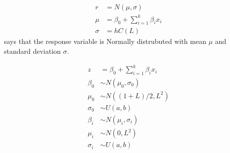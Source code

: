 \begin{align}
 r      & = N(\mu, \sigma)                    \label{eq:response-main}                   \\
 \mu    & = \beta_0 + \sum_{i=1}^k \beta_i x_i                        \label{eq:mu-main} \\
 \sigma & = hC(L) \label{eq:main-sigma}
\end{align}
 says that the response variable is Normally distrubuted with mean $\mu$ and standard deviation $\sigma$.

\begin{align}
 z        & = \beta_0 + \sum_{i=1}^k \beta_i x_i \\
 \beta_0  & \sim N(\mu_0, \sigma_0)              \\
 \mu_0    & \sim N((1+L)/2, L^2)                 \\
 \sigma_0 & \sim U(a,b)                          \\
 \beta_i  & \sim  N(\mu_i, \sigma_i)             \\
 \mu_i    & \sim N(0, L^2)                       \\
 \sigma_i & \sim U(a,b)
\end{align}
